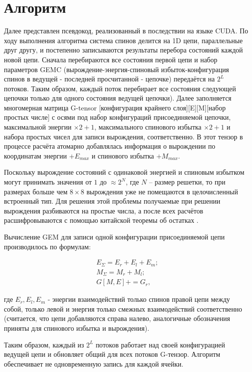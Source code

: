 \documentclass[10pt]{article}
\begin{document}
	\section{Алгоритм}
	Далее представлен псевдокод, реализованный в последствии на языке CUDA. По ходу выполнения алгоритма система спинов делится на 1D цепи, параллельные друг другу, и постепенно записываются результаты перебора состояний каждой новой цепи. Сначала перебираются все состояния первой цепи и набор параметров GEMC (вырождение-энергия-спиновый избыток-конфигурация спинов в ведущей - последней просчитанной - цепочке) передаётся на $2^L$ потоков. Таким образом, каждый поток перебирает все состояния следующей цепочки только для одного состояния ведущей цепочки). Далее заполняется многомерная матрица G-tensor [конфигурация крайнего слоя][E][M][набор простых числе] с осями под набор конфигураций присоединяемой цепочки, максимальной энергии $\times 2 + 1$, максимального спинового избытка $\times 2 + 1$ и набора простых чисел для записи вырождения, соответственно. В этот тензор в процессе расчёта атомарно добавлялась информация о вырождении по координатам энергии $+ E_{max}$ и спинового избытка $+ M_{max}$.
	
	Поскольку вырождение состояний с одинаковой энергией и спиновым избытком могут принимать значения от $1$ до $\approx 2^{N}$, где $N$ -- размер решетки, то при размерах больше чем $8 \times 8$ вырождения уже не помещаются в целочисленный встроенный тип. Для решения этой проблемы получаемые при решении вырождения разбиваются на простые числа, а после всех расчётов расшифровываются с помощью китайской теоремы об остатках \cite{katz2007mathematics}.
	
	Вычисление GEM для записи одной конфигурации присоединяемой цепи производилось по формулам:
	
	\begin{equation}
		\begin{split}
		E_\Sigma = E_r + E_l + E_m; \\
		M_\Sigma = M_r + M_l; \\
		G[M, E] += G_r,
		\end{split}
	\end{equation}
	
	где $E_r, E_l, E_m$ - энергии взаимодействий только спинов правой цепи между собой, только левой и энергия только смежных взаимодействий соответственно (считается, что цепи добавляются справа налево, аналогичные обозначения приняты для спинового избытка и вырождения).
	
	Таким образом, каждый из $2^L$ потоков работает над своей конфигурацией ведущей цепи и обновляет общий для всех потоков G-тензор. Алгоритм обеспечивает не одновременную запись для каждой ячейки. 
	
\end{document}
